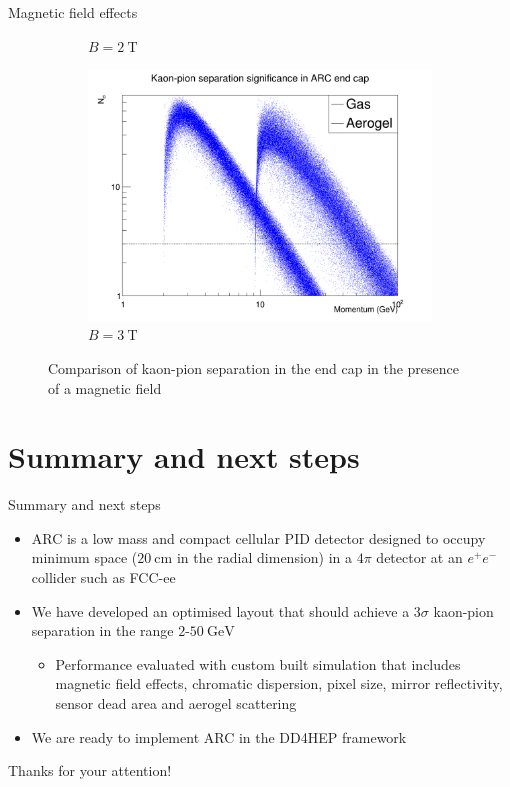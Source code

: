 \documentclass{beamer}
\begin{document}
\begin{frame}{Magnetic field effects}
\begin{figure}
\begin{subfigure}{0.33\textwidth}
      \caption{$B = \SI{2}{\tesla}$}
    \end{subfigure}%
    \begin{subfigure}{0.33\textwidth}
      \includegraphics[width = 1.0\textwidth]{Plots/Significance_Scatter_PionKaon_EndCap_MagOn_3T.png}
      \caption{$B = \SI{3}{\tesla}$}
    \end{subfigure}
    \caption{Comparison of kaon-pion separation in the end cap in the presence of a magnetic field}
  \end{figure}
\end{frame}

\section{Summary and next steps}
\begin{frame}{Summary and next steps}
  \begin{itemize}
    \setlength\itemsep{1.0em}
    \item{ARC is a low mass and compact cellular PID detector designed to occupy minimum space ($\SI{20}{\centi\meter}$ in the radial dimension) in a $4\pi$ detector at an $e^+e^-$ collider such as FCC-ee}
    \item{We have developed an optimised layout that should achieve a $3\sigma$ kaon-pion separation in the range $2$-$\SI{50}{\giga\eV}$}
    \begin{itemize}
      \item{Performance evaluated with custom built simulation that includes magnetic field effects, chromatic dispersion, pixel size, mirror reflectivity, sensor dead area and aerogel scattering}
    \end{itemize}
    \item{We are ready to implement ARC in the DD4HEP framework}
  \end{itemize}
  \begin{center}
    \huge Thanks for your attention!
  \end{center}
\end{frame}
\end{document}
